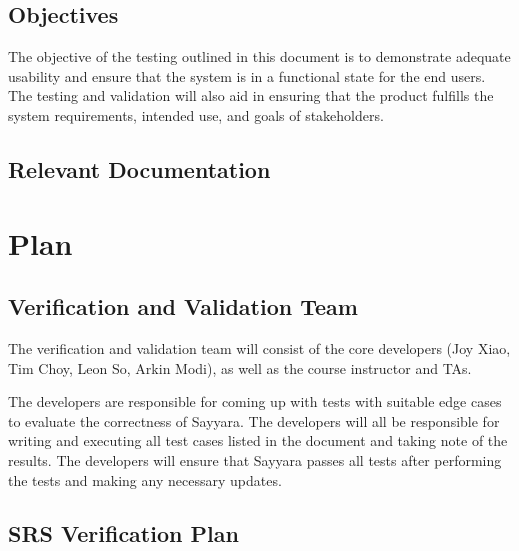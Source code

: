 \documentclass[12pt, titlepage]{article}
\begin{document}
\subsection{Objectives}

The objective of the testing outlined in this document is to demonstrate adequate usability and
ensure that the system is in a functional state for the end users. The testing and validation will
also aid in ensuring that the product fulfills the system requirements, intended use, and goals of
stakeholders.

\subsection{Relevant Documentation}


\citet{SRS}

\section{Plan}


\subsection{Verification and Validation Team}

The verification and validation team will consist of the core developers (Joy Xiao, Tim Choy, Leon
So, Arkin Modi), as well as the course instructor and TAs.

The developers are responsible for coming up with tests with suitable edge cases to evaluate the
correctness of Sayyara. The developers will all be responsible for writing and executing all test
cases listed in the document and taking note of the results. The developers will ensure that
Sayyara passes all tests after performing the tests and making any necessary updates.

\subsection{SRS Verification Plan}
\end{document}
